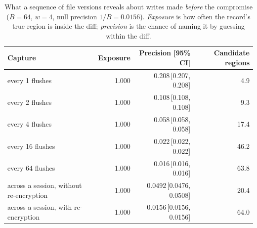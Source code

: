 \begin{table}[t]
\centering
\caption{What a sequence of file versions reveals about writes made \emph{before} the
compromise ($B=64$, $w=4$, null precision $1/B=0.0156$).
\emph{Exposure} is how often the record's true region is inside the diff; \emph{precision} is
the chance of naming it by guessing within the diff.}
\label{tab:e8}
\small
\setlength{\tabcolsep}{4pt}
\begin{tabular}{lrrr}
\toprule
Capture & Exposure & Precision [95\% CI] & Candidate regions \\
\midrule
every 1 flushes & 1.000 & 0.208\,[0.207, 0.208] & 4.9 \\
every 2 flushes & 1.000 & 0.108\,[0.108, 0.108] & 9.3 \\
every 4 flushes & 1.000 & 0.058\,[0.058, 0.058] & 17.4 \\
every 16 flushes & 1.000 & 0.022\,[0.022, 0.022] & 46.2 \\
every 64 flushes & 1.000 & 0.016\,[0.016, 0.016] & 63.8 \\
across a session, without re-encryption & 1.000 & 0.0492\,[0.0476, 0.0508] & 20.4 \\
across a session, with re-encryption & 1.000 & 0.0156\,[0.0156, 0.0156] & 64.0 \\
\bottomrule
\end{tabular}
\end{table}
